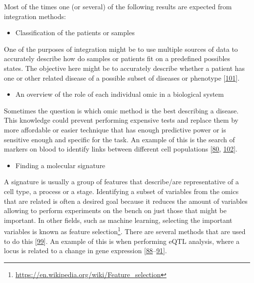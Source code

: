 \documentclass[
  a4paper,
]{book}
\DeclareRobustCommand{\href}[2]{#2\footnote{\url{#1}}}
\providecommand{\tightlist}{%
  \setlength{\itemsep}{0pt}\setlength{\parskip}{0pt}}
\begin{document}
Most of the times one (or several) of the following results are expected from integration methods:

\begin{itemize}
\tightlist
\item
  Classification of the patients or samples
\end{itemize}

One of the purposes of integration might be to use multiple sources of data to accurately describe how do samples or patients fit on a predefined possibles states.
The objective here might be to accurately describe whether a patient has one or other related disease of a possible subset of diseases or phenotype {[}\protect\hyperlink{ref-rohart2016}{101}{]}.

\begin{itemize}
\tightlist
\item
  An overview of the role of each individual omic in a biological system
\end{itemize}

Sometimes the question is which omic method is the best describing a disease.
This knowledge could prevent performing expensive tests and replace them by more affordable or easier technique that has enough predictive power or is sensitive enough and specific for the task.
An example of this is the search of markers on blood to identify links between different cell populations {[}\protect\hyperlink{ref-tang2017}{80}, \protect\hyperlink{ref-ibrahim2017}{102}{]}.

\begin{itemize}
\tightlist
\item
  Finding a molecular signature
\end{itemize}

A signature is usually a group of features that describe/are representative of a cell type, a process or a stage.
Identifying a subset of variables from the omics that are related is often a desired goal because it reduces the amount of variables allowing to perform experiments on the bench on just those that might be important.
In other fields, such as machine learning, selecting the important variables is known as \href{https://en.wikipedia.org/wiki/Feature_selection}{feature selection}.
There are several methods that are used to do this {[}\protect\hyperlink{ref-cavill2016}{99}{]}.
An example of this is when performing eQTL analysis, where a locus is related to a change in gene expression {[}\protect\hyperlink{ref-repnik2016}{88}--\protect\hyperlink{ref-dai2019}{91}{]}.
\end{document}
